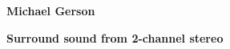 \documentclass[11pt]{article}
\begin{document}
\begin{minipage}{0.55\linewidth}
\vspace{0.3cm}
{\large{\textbf{\textsf{Michael Gerson}}}}\\\end{minipage}

\begin{minipage}{0.95\linewidth}
\begin{center}
{\huge{\textbf{\textsf{Surround sound from 2-channel stereo}}}} \\

\end{center}
\end{minipage}
\vspace*{0.3cm}


\end{document}
